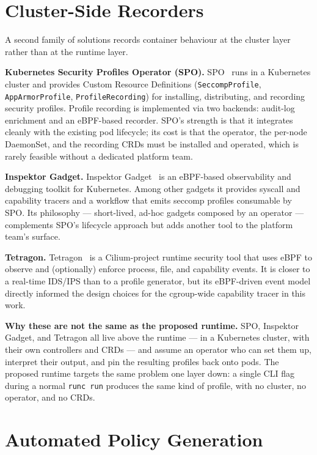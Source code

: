 \section{Cluster-Side Recorders}

A second family of solutions records container behaviour at the cluster layer rather than at the runtime layer.

\textbf{Kubernetes Security Profiles Operator (SPO).} SPO~\cite{spo2025} runs in a Kubernetes cluster and provides Custom Resource Definitions (\texttt{SeccompProfile}, \texttt{AppArmorProfile}, \texttt{ProfileRecording}) for installing, distributing, and recording security profiles. Profile recording is implemented via two backends: audit-log enrichment and an eBPF-based recorder. SPO's strength is that it integrates cleanly with the existing pod lifecycle; its cost is that the operator, the per-node DaemonSet, and the recording CRDs must be installed and operated, which is rarely feasible without a dedicated platform team.

\textbf{Inspektor Gadget.} Inspektor Gadget~\cite{inspektorgadget2025} is an eBPF-based observability and debugging toolkit for Kubernetes. Among other gadgets it provides syscall and capability tracers and a workflow that emits seccomp profiles consumable by SPO. Its philosophy --- short-lived, ad-hoc gadgets composed by an operator --- complements SPO's lifecycle approach but adds another tool to the platform team's surface.

\textbf{Tetragon.} Tetragon~\cite{tetragon2025} is a Cilium-project runtime security tool that uses eBPF to observe and (optionally) enforce process, file, and capability events. It is closer to a real-time IDS/IPS than to a profile generator, but its eBPF-driven event model directly informed the design choices for the cgroup-wide capability tracer in this work.

\textbf{Why these are not the same as the proposed runtime.} SPO, Inspektor Gadget, and Tetragon all live above the runtime --- in a Kubernetes cluster, with their own controllers and CRDs --- and assume an operator who can set them up, interpret their output, and pin the resulting profiles back onto pods. The proposed runtime targets the same problem one layer down: a single CLI flag during a normal \texttt{runc run} produces the same kind of profile, with no cluster, no operator, and no CRDs.

\section{Automated Policy Generation}

